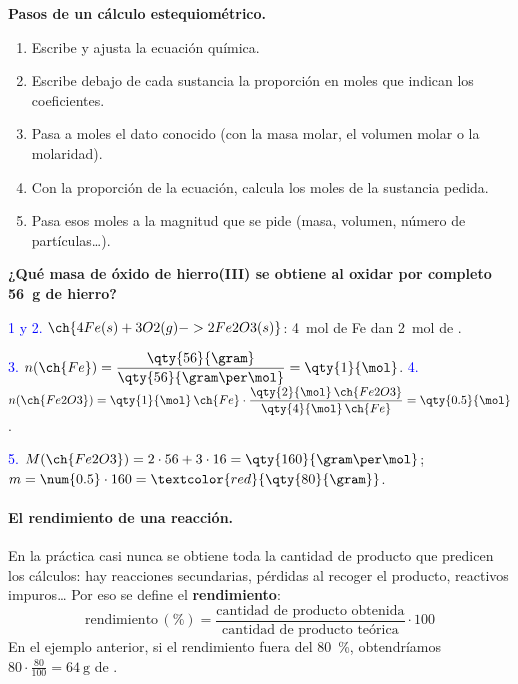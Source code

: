 \begin{marker}
    \textbf{Pasos de un cálculo estequiométrico.}
    \begin{enumerate}[label=\arabic*.]
        \item Escribe y ajusta la ecuación química.
        \item Escribe debajo de cada sustancia la proporción en moles que indican los coeficientes.
        \item Pasa a moles el dato conocido (con la masa molar, el volumen molar o la molaridad).
        \item Con la proporción de la ecuación, calcula los moles de la sustancia pedida.
        \item Pasa esos moles a la magnitud que se pide (masa, volumen, número de partículas\ldots).
    \end{enumerate}
\end{marker}

\begin{example}
    \textbf{¿Qué masa de óxido de hierro(III) se obtiene al oxidar por completo \qty{56}{\gram} de hierro?}

    \textcolor{blue}{1 y 2.} \(\ch{4 Fe (s) + 3 O2 (g) -> 2 Fe2O3 (s)}\): \quad \qty{4}{\mol} de Fe dan \qty{2}{\mol} de .

    \textcolor{blue}{3.} \(n(\ch{Fe}) = \dfrac{\qty{56}{\gram}}{\qty{56}{\gram\per\mol}} = \qty{1}{\mol}\).
    \qquad \textcolor{blue}{4.} \(n(\ch{Fe2O3}) = \qty{1}{\mol}\,\ch{Fe} \cdot \dfrac{\qty{2}{\mol}\,\ch{Fe2O3}}{\qty{4}{\mol}\,\ch{Fe}} = \qty{0.5}{\mol}\).

    \textcolor{blue}{5.} \(M(\ch{Fe2O3}) = 2 \cdot 56 + 3 \cdot 16 = \qty{160}{\gram\per\mol}\); \quad \(m = \num{0.5} \cdot 160 = \textcolor{red}{\qty{80}{\gram}}\).
\end{example}

\paragraph{El rendimiento de una reacción.} En la práctica casi nunca se obtiene toda la cantidad de producto que predicen los cálculos: hay reacciones secundarias, pérdidas al recoger el producto, reactivos impuros\ldots{} Por eso se define el \textbf{rendimiento}:
\[ \text{rendimiento}\,(\%) = \frac{\text{cantidad de producto obtenida}}{\text{cantidad de producto teórica}} \cdot 100 \]
En el ejemplo anterior, si el rendimiento fuera del \qty{80}{\percent}, obtendríamos \(80 \cdot \frac{80}{100} = \qty{64}{\gram}\) de .

